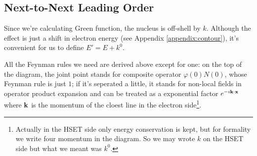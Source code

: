 \documentclass[aps,prd,preprint,showkeys,10pt]{revtex4-1}
\newcommand{\vbk}{\vb{k}}
\begin{document}
\subsection{Next-to-Next Leading Order}
Since we're calculating Green function, the nucleus is off-shell by $k$. Although the effect is just a shift in electron energy (see Appendix \ref{appendix:contour}), it's convenient for us to define $E'=E+k^0$.

All the Feynman rules we need are derived above except for one: on the top of the diagram, the joint point stands for composite operator $\varphi(0)N(0)$, whose Feynman rule is just $1$; if it's seperated a little, it stands for non-local fields in operator product expansion and can be treated as a exponential factor $e^{-i \vbk \cdot \vb{x}}$ where $\vbk$ is the momentum of the cloest line in the electron side\footnote{Actually in the HSET side only energy conservation is kept, but for formality we write four momentum in the diagram. So we may wrote $k$ on the HSET side but what we meant was $k^0$. }.
\end{document}
